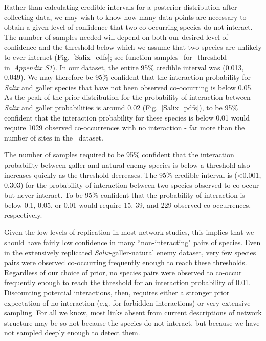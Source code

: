 \documentclass[12pt]{article}
\begin{document}
\begin{spacing}{2.0}
      Rather than calculating credible intervals for a posterior distribution after collecting data, we may wish to know how many data points are necessary to obtain a given level of confidence that two co-occurring species do not interact. The number of samples needed will depend on both our desired level of confidence and the threshold below which we assume that two species are unlikely to ever interact (Fig.~\ref{Salix_cdfs}; see function samples\_for\_threshold in~\emph{Appendix S1}). In our dataset, the entire 95\% credible interval was (0.013, 0.049). We may therefore be 95\% confident that the interaction probability for \emph{Salix} and galler species that have not been observed co-occurring is below 0.05. As the peak of the prior distribution for the probability of interaction between \emph{Salix} and galler probabilities is around 0.02 (Fig.~\ref{Salix_pdfs}), to be 95\% confident that the interaction probability for these species is below 0.01 would require 1029 observed co-occurrences with no interaction - far more than the number of sites in the~\citep{Kopelke2017} dataset.


      The number of samples required to be 95\% confident that the interaction probability between galler and natural enemy species is below a threshold also increases quickly as the threshold decreases. The 95\% credible interval is (\textless0.001, 0.303) for the probability of interaction between two species observed to co-occur but never interact. To be 95\% confident that the probability of interaction is below 0.1, 0.05, or 0.01 would require 15, 39, and 229 observed co-occurrences, respectively.


      Given the low levels of replication in most network studies, this implies that we should have fairly low confidence in many ``non-interacting" pairs of species. Even in the extensively replicated \emph{Salix}-galler-natural enemy dataset, very few species pairs were observed co-occurring frequently enough to reach these thresholds.  Regardless of our choice of prior, no species pairs were observed to co-occur frequently enough to reach the threshold for an interaction probability of 0.01. Discounting potential interactions, then, requires either a stronger prior expectation of no interaction (e.g. for forbidden interactions) or very extensive sampling. For all we know, most links absent from current descriptions of network structure may be so not because the species do not interact, but because we have not sampled deeply enough to detect them.



\end{spacing}
\end{document}
